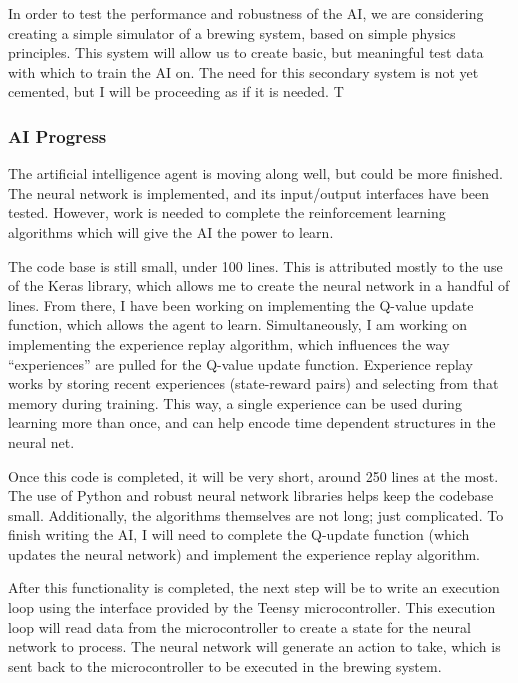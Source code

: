 \documentclass[draftclsnofoot,onecolumn,letterpaper,10pt]{IEEEtran}
\begin{document}
In order to test the performance and robustness of the AI, we are considering creating a simple simulator of a brewing system, based on simple physics principles.
This system will allow us to create basic, but meaningful test data with which to train the AI on. 
The need for this secondary system is not yet cemented, but I will be proceeding as if it is needed.
T


\subsubsection{AI Progress}
The artificial intelligence agent is moving along well, but could be more finished.
The neural network is implemented, and its input/output interfaces have been tested.
However, work is needed to complete the reinforcement learning algorithms which will give the AI the power to learn.

The code base is still small, under 100 lines.
This is attributed mostly to the use of the Keras library, which allows me to create the neural network in a handful of lines.
From there, I have been working on implementing the Q-value update function, which allows the agent to learn.
Simultaneously, I am working on implementing the experience replay algorithm, which influences the way ``experiences'' are pulled for the Q-value update function.
Experience replay works by storing recent experiences (state-reward pairs) and selecting from that memory during training.
This way, a single experience can be used during learning more than once, and can help encode time dependent structures in the neural net.

Once this code is completed, it will be very short, around 250 lines at the most. The use of Python and robust neural network libraries helps keep the codebase small. Additionally, the algorithms themselves are not long; just complicated.
To finish writing the AI, I will need to complete the Q-update function (which updates the neural network) and implement the experience replay algorithm.

After this functionality is completed, the next step will be to write an execution loop using the interface provided by the Teensy microcontroller.
This execution loop will read data from the microcontroller to create a state for the neural network to process.
The neural network will generate an action to take, which is sent back to the microcontroller to be executed in the brewing system.
\end{document}
